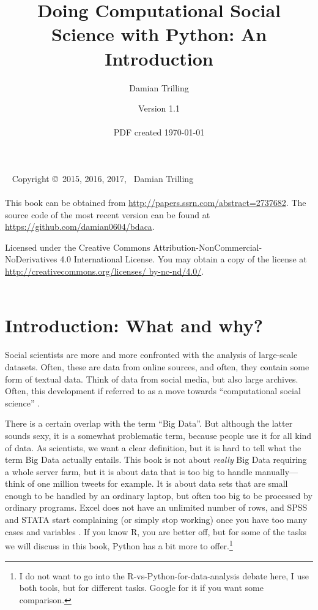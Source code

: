 \documentclass[a4paper,12pt]{book}
\title{Doing Computational Social Science with Python: An Introduction}
\author{Damian Trilling}
\date{Version 1.1\\ ~ \\  \footnotesize{PDF created \today}}
\begin{document}
\frontmatter

\maketitle

\newpage

{~\vfill
\thispagestyle{empty}
\setlength{\parindent}{0pt}
\setlength{\parskip}{\baselineskip}
Copyright \copyright\ 2015, 2016, 2017, \the\year\ Damian Trilling\\
\vspace{.25cm} \\
This book can be obtained from \url{http://papers.ssrn.com/abstract=2737682}. The source code of the most recent version can be found at \url{https://github.com/damian0604/bdaca}.


\par Licensed under the Creative Commons Attribution-NonCommercial-NoDerivatives 4.0 International License. You may obtain a copy of the license at \url{http://creativecommons.org/licenses/ by-nc-nd/4.0/}. \\
\vspace{.5cm} \\
\ccbyncnd

}


\newpage

\tableofcontents


\chapter{Introduction: What and why?}

Social scientists are more and more confronted with the analysis of large-scale datasets. Often, these are data from online sources, and often, they contain some form of textual data. Think of data from social media, but also large archives. Often, this development if referred to as a move towards ``computational social science'' \citep{Lazer2009,Kitchin2014}.

There is a certain overlap with the term ``Big Data''. But although the latter sounds sexy, it is a somewhat problematic term, because people use it for all kind of data. As scientists, we want a clear definition, but it is hard to tell what the term Big Data actually entails. This book is not about \emph{really} Big Data requiring a whole server farm, but it is about data that is too big to handle manually---think of one million tweets for example. It is about data sets that are small enough to be handled by an ordinary laptop, but often too big to be processed by ordinary programs. Excel does not have an unlimited number of rows, and SPSS and STATA start complaining (or simply stop working) once you have too many cases and variables \citep[see, e.g.,][]{Trilling2017a}. If you know R, you are better off, but for some of the tasks we will discuss in this book, Python has a bit more to offer.\footnote{I do not want to go into the R-vs-Python-for-data-analysis debate here, I use both tools, but for different tasks. Google for it if you want some comparison.}  
\end{document}
